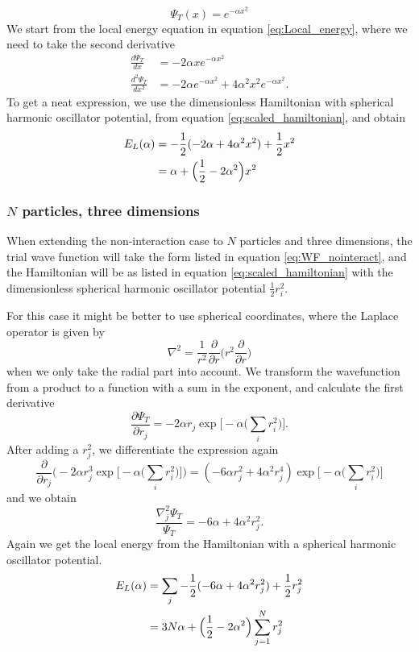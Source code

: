 \documentclass[norsk,a4paper,12pt]{article}
\begin{document}
\begin{equation}
	\label{eq:WF_1dim_1N}
	\Psi_T(x) = e^{-\alpha x^2} 
\end{equation}
We start from the local energy equation in equation \ref{eq:Local_energy}, where we need to take the second derivative
\begin{align}
\frac{d\Psi_T}{dx}&=-2\alpha xe^{-\alpha x^2}\\
\frac{d^2\Psi_T}{dx^2}&=-2\alpha e^{-\alpha x^2}+4\alpha^2x^2e^{-\alpha x^2}.
\end{align}
To get a neat expression, we use the dimensionless Hamiltonian with spherical harmonic oscillator potential, from equation \ref{eq:scaled_hamiltonian}, and obtain
\begin{align}
E_L(\alpha)&=-\frac{1}{2}(-2\alpha + 4\alpha^2x^2)+\frac{1}{2}x^2\notag\\
&=\alpha+\Big(\frac{1}{2}-2\alpha^2\Big)x^2
\end{align}

\subsubsection{$N$ particles, three dimensions}

When extending the non-interaction case to $N$ particles and three dimensions, the trial wave function will take the form listed in equation \ref{eq:WF_nointeract}, and the Hamiltonian will be as listed in equation \ref{eq:scaled_hamiltonian} with the dimensionless spherical harmonic oscillator potential $\frac{1}{2}r_i^2$.


For this case it might be better to use spherical coordinates, where the Laplace operator is given by
\begin{equation}
\nabla^2=\frac{1}{r^2}\frac{\partial}{\partial r}\bigg(r^2\frac{\partial}{\partial r}\bigg)
\end{equation}
when we only take the radial part into account. We transform the wavefunction from a product to a function with a sum in the exponent, and calculate the first derivative
\begin{equation}
\frac{\partial\Psi_T}{\partial r_j}=-2\alpha r_j \exp\bigg[-\alpha\bigg(\sum_i r_i^2\bigg)\bigg].
\end{equation}
After adding a $r_j^2$, we differentiate the expression again
\begin{equation*}
\frac{\partial}{\partial r_j}\bigg(-2\alpha r_j^3\exp\Big[-\alpha\Big(\sum_i r_i^2\Big)\Big]\bigg)
=(-6\alpha r_j^2 + 4\alpha^2r_j^4)\exp\Big[-\alpha\Big(\sum_i r_i^2\Big)\Big]
\end{equation*}
and we obtain
\begin{equation}
\frac{\nabla_j^2\Psi_T}{\Psi_T}=-6\alpha+4\alpha^2r_j^2.
\end{equation}
Again we get the local energy from the Hamiltonian with a spherical harmonic oscillator potential. 
\begin{align}
E_L(\alpha)&=\sum_j-\frac{1}{2}(-6\alpha+4\alpha^2r_j^2) + \frac{1}{2}r_j^2\notag\\
&=3N\alpha + \Big(\frac{1}{2}-2\alpha^2\Big)\sum_{j=1}^Nr_j^2
\end{align}
\end{document}

